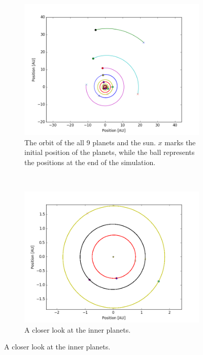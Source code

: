 \documentclass[a4paper, 10pt]{article}
\begin{document}
\begin{figure}[H]
\centering
\begin{subfigure}[t]{0.5\textwidth}
\centering
\includegraphics[width=\textwidth]{part2fullSystem.png}
\caption{The orbit of the all 9 planets and the sun. $x$ marks the initial position of the planets, while the ball represents the positions at the end of the simulation.}
\end{subfigure}%
~
\begin{subfigure}[t]{0.5\textwidth}
\centering
\includegraphics[width=\textwidth]{part2innerPlanets.png}
\caption{A closer look at the inner planets.}
\end{subfigure}%
\end{figure}
\end{document}
